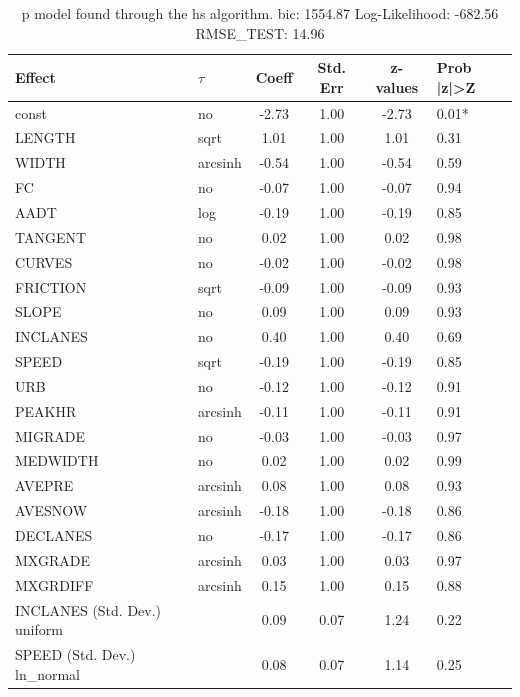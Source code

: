 \begin{table}
	\caption{p model found through the hs algorithm. bic: 1554.87 Log-Likelihood: -682.56 RMSE_TEST: 14.96}
	\begin{center}
		\begin{tabular}{|l|l|c|c|c|l|}
			\hline
			Effect & $\tau$ & Coeff & Std. Err & z-values & Prob |z|>Z \\
			\hline
			const & no & -2.73 & 1.00 & -2.73 & 0.01* \\
			\hline
			LENGTH & sqrt & 1.01 & 1.00 & 1.01 & 0.31 \\
			\hline
			WIDTH & arcsinh & -0.54 & 1.00 & -0.54 & 0.59 \\
			\hline
			FC & no & -0.07 & 1.00 & -0.07 & 0.94 \\
			\hline
			AADT & log & -0.19 & 1.00 & -0.19 & 0.85 \\
			\hline
			TANGENT & no & 0.02 & 1.00 & 0.02 & 0.98 \\
			\hline
			CURVES & no & -0.02 & 1.00 & -0.02 & 0.98 \\
			\hline
			FRICTION & sqrt & -0.09 & 1.00 & -0.09 & 0.93 \\
			\hline
			SLOPE & no & 0.09 & 1.00 & 0.09 & 0.93 \\
			\hline
			INCLANES & no & 0.40 & 1.00 & 0.40 & 0.69 \\
			\hline
			SPEED & sqrt & -0.19 & 1.00 & -0.19 & 0.85 \\
			\hline
			URB & no & -0.12 & 1.00 & -0.12 & 0.91 \\
			\hline
			PEAKHR & arcsinh & -0.11 & 1.00 & -0.11 & 0.91 \\
			\hline
			MIGRADE & no & -0.03 & 1.00 & -0.03 & 0.97 \\
			\hline
			MEDWIDTH & no & 0.02 & 1.00 & 0.02 & 0.99 \\
			\hline
			AVEPRE & arcsinh & 0.08 & 1.00 & 0.08 & 0.93 \\
			\hline
			AVESNOW & arcsinh & -0.18 & 1.00 & -0.18 & 0.86 \\
			\hline
			DECLANES & no & -0.17 & 1.00 & -0.17 & 0.86 \\
			\hline
			MXGRADE & arcsinh & 0.03 & 1.00 & 0.03 & 0.97 \\
			\hline
			MXGRDIFF & arcsinh & 0.15 & 1.00 & 0.15 & 0.88 \\
			\hline
			INCLANES (Std. Dev.) uniform &  & 0.09 & 0.07 & 1.24 & 0.22 \\
			\hline
			SPEED (Std. Dev.) ln_normal &  & 0.08 & 0.07 & 1.14 & 0.25 \\

\end{tabular}
\end{center}
\end{table}
